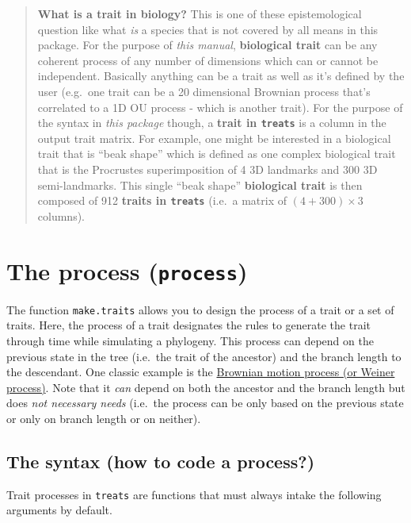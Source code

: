 \documentclass[
]{book}
\begin{document}
\begin{quote}
\textbf{What is a trait in biology?} This is one of these epistemological question like what \emph{is} a species that is not covered by all means in this package.
For the purpose of \emph{this manual}, \textbf{biological trait} can be any coherent process of any number of dimensions which can or cannot be independent.
Basically anything can be a trait as well as it's defined by the user (e.g.~one trait can be a 20 dimensional Brownian process that's correlated to a 1D OU process - which is another trait).
For the purpose of the syntax in \emph{this package} though, a \textbf{trait in \texttt{treats}} is a column in the output trait matrix.
For example, one might be interested in a biological trait that is ``beak shape'' which is defined as one complex biological trait that is the Procrustes superimposition of 4 3D landmarks and 300 3D semi-landmarks.
This single ``beak shape'' \textbf{biological trait} is then composed of 912 \textbf{traits in \texttt{treats}} (i.e.~a matrix of \((4+300)\times3\) columns).
\end{quote}

\hypertarget{the-process-process}{%
\section{\texorpdfstring{The process (\texttt{process})}{The process (process)}}\label{the-process-process}}

The function \texttt{make.traits} allows you to design the process of a trait or a set of traits.
Here, the process of a trait designates the rules to generate the trait through time while simulating a phylogeny.
This process can depend on the previous state in the tree (i.e.~the trait of the ancestor) and the branch length to the descendant.
One classic example is the \href{https://en.wikipedia.org/wiki/Brownian_motion}{Brownian motion process (or Weiner process)}.
Note that it \emph{can} depend on both the ancestor and the branch length but does \emph{not necessary needs} (i.e.~the process can be only based on the previous state or only on branch length or on neither).

\hypertarget{the-syntax-how-to-code-a-process}{%
\subsection{The syntax (how to code a process?)}\label{the-syntax-how-to-code-a-process}}

Trait processes in \texttt{treats} are functions that must always intake the following arguments by default.
\end{document}
